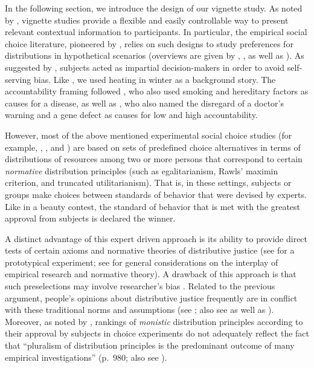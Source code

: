 \documentclass[smallcondensed]{svjour3}
\begin{document}
In the following section, we introduce the design of our vignette study. As noted by \citet{konow_which_2003}, vignette studies provide a flexible and easily controllable way to present relevant contextual information to participants. In particular, the empirical social choice literature, pioneered by \citet{yaari_dividing_1984}, relies on such designs to study preferences for distributions in hypothetical scenarios (overviews are given by \citealt{schokkaert_m_1999}, \citealt{schwettmann_trading_2009}, as well as \citealt{gaertner_empirical_2012}). As suggested by \cite{konow_which_2003,konow_blind_2005}, subjects acted as impartial decision-makers in order to avoid self-serving bias. Like \citet{schwettmann_competing_2012}, we used heating in winter as a background story. The accountability framing followed \citet{diederich_zur_2010}, who also used smoking and hereditary factors as causes for a disease, as well as \citet{skitka_allocating_1992}, who also named the disregard of a doctor's warning and a gene defect as causes for low and high accountability.\par
%
However, most of the above mentioned experimental social choice studies (for example, \citealt{gaertner_equity_2007}, \citealt{schwettmann_competing_2012}, and \citealt{ahlert_thresholds_2012}) are based on sets of predefined choice alternatives in terms of distributions of resources among two or more persons that correspond to certain \textit{normative} distribution principles (such as egalitarianism, Rawls' maximin criterion, and truncated utilitarianism). That is, in these settings, subjects or groups make choices between standards of behavior that were devised by experts. Like in a beauty contest, the standard of behavior that is met with the greatest approval from subjects is declared the winner.\par
%
A distinct advantage of this expert driven approach is its ability to provide direct tests of certain axioms and normative theories of distributive justice (see \citealt{frohlich_choices_1987} for a prototypical experiment; see \citealt{bauer_philosophie_2019, bauer_empirical_2020} for general considerations on the interplay of empirical research and normative theory). A drawback of this approach is that such preselections may involve researcher's bias \citep{ahlert_thresholds_2012}. Related to the previous argument, people's opinions about distributive justice frequently are in conflict with these traditional norms and assumptions (see \citealt{schokkaert_m_1999}; also see \citealt{amiel_thinking_1999} as well as \citealt{traub_friedman_2005}). Moreover, as noted by \citet{ahlert_thresholds_2012}, rankings of \textit{monistic} distribution principles according to their approval by subjects in choice experiments do not adequately reflect the fact that ``pluralism of distribution principles is the predominant outcome of many empirical investigations'' (p.~980; also see \citealt{konow_which_2003}).\par
\end{document}
